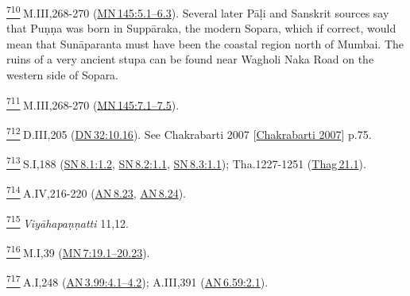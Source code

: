\label{footprints_split_025.html_fn710}
\hyperref[footprints_split_018.htmlux5cux23fnref710]{\textsuperscript{710}} M.III,268-270
(\href{https://suttacentral.net/mn145/en/sujato\#5.1}{MN\,145:5.1--6.3}).
Several later Pāḷi and Sanskrit sources say that Puṇṇa was born in
Suppāraka, the modern Sopara, which if correct, would mean that
Sunāparanta must have been the coastal region north of Mumbai. The ruins
of a very ancient stupa can be found near Wagholi Naka Road on the
western side of Sopara.

\label{footprints_split_025.html_fn711}
\hyperref[footprints_split_018.htmlux5cux23fnref711]{\textsuperscript{711}} M.III,268-270
(\href{https://suttacentral.net/mn145/en/sujato\#7.1}{MN\,145:7.1--7.5}).

\label{footprints_split_025.html_fn712}
\hyperref[footprints_split_019.htmlux5cux23fnref712]{\textsuperscript{712}} D.III,205
(\href{https://suttacentral.net/dn32/en/sujato\#10.16}{DN\,32:10.16}).
See {Chakrabarti 2007
{{[}\hyperref[footprints_split_022.htmlux5cux23Chakrabartiux5cux25202007]{Chakrabarti
2007}{]}}} p.75.

\label{footprints_split_025.html_fn713}
\hyperref[footprints_split_019.htmlux5cux23fnref713]{\textsuperscript{713}} S.I,188
(\href{https://suttacentral.net/sn8.1/en/sujato\#1.2}{SN\,8.1:1.2},
\href{https://suttacentral.net/sn8.2/en/sujato\#1.1}{SN\,8.2:1.1},
\href{https://suttacentral.net/sn8.3/en/sujato\#1.1}{SN\,8.3:1.1});
Tha.1227-1251
(\href{https://suttacentral.net/thag21.1/en/sujato}{Thag\,21.1}).

\label{footprints_split_025.html_fn714}
\hyperref[footprints_split_019.htmlux5cux23fnref714]{\textsuperscript{714}} A.IV,216-220
(\href{https://suttacentral.net/an8.23/en/sujato}{AN\,8.23},
\href{https://suttacentral.net/an8.24/en/sujato}{AN\,8.24}).

\label{footprints_split_025.html_fn715}
\hyperref[footprints_split_019.htmlux5cux23fnref715]{\textsuperscript{715}} \emph{Viyāhapaṇṇatti}
11,12.

\label{footprints_split_025.html_fn716}
\hyperref[footprints_split_019.htmlux5cux23fnref716]{\textsuperscript{716}} M.I,39
(\href{https://suttacentral.net/mn7/en/sujato\#19.1}{MN\,7:19.1--20.23}).

\label{footprints_split_025.html_fn717}
\hyperref[footprints_split_019.htmlux5cux23fnref717]{\textsuperscript{717}} A.I,248
(\href{https://suttacentral.net/an3.99/en/sujato\#4.1}{AN\,3.99:4.1--4.2});
A.III,391
(\href{https://suttacentral.net/an6.59/en/sujato\#2.1}{AN\,6.59:2.1}).

